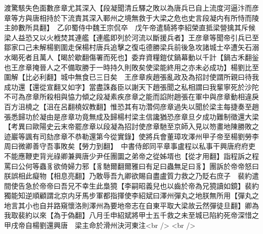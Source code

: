 渡驚駭失色面數彦章尤其深入【段凝聞清丘驛之敗以為唐兵已自上流度河逼汴而彦章等方與唐相持於下流責其深入鄆州之境無救于大梁之危也史言段凝内有所恃而陵主帥數所具翻】　乙卯蜀侍中魏王宗侃卒　戊午帝遣騎將李紹榮直抵梁營擒其斥候梁人益恐又以火栰焚其連艦【連艦即列於河流以斷援兵者】王彦章等聞帝引兵已至鄒家口己未解楊劉圍走保楊村唐兵追擊之復屯德勝梁兵前後急攻諸城士卒遭矢石溺水暍死者且萬人【暍於歇翻傷署而死也】委弃資糧鎧仗鍋幕動以千計【鍋古禾翻釡也王彦章掩晉人之不備取勝于一時持久則敗矣使梁能終用之亦未必成功】楊劉比至圍解【比必利翻】城中無食已三日矣　王彦章疾趙張亂政及為招討使謂所親曰待我成功還【還從宣翻又如字】當盡誅姦臣以謝天下趙張聞之私相謂曰我輩寧死於沙陀不可為彦章所殺相與恊力傾之段凝素疾彦章之能而諂附趙張在軍中與彦章動相違戾百方沮橈之【沮在呂翻橈奴教翻】惟恐其有功濳伺彦章過失以聞於梁主每捷奏至趙張悉歸功於凝由是彦章功竟無成及歸楊村梁主信讒猶恐彦章旦夕成功難制徵還大梁　【考異曰歐陽史云末帝罷彦章以段凝為招討使彦章馳至京師入見以笏畫地陳勝敗之迹巖等諷有司劾彦章不恭勒還第今從實錄】使將兵會董璋攻澤州甲子帝至楊劉勞李周曰微卿善守吾事敗矣【勞力到翻】　中書侍郎同平章事盧程以私事干興唐府府吏不能應鞭吏背光祿卿兼興唐少尹任團圜之弟帝之從姊壻也【從才用翻】詣程訴之程罵曰公何等蟲豸欲倚婦力邪【豸馳爾翻爾雅曰有足曰蟲無足曰豸】團訴於帝帝怒曰朕誤相此癡物【相息亮翻】乃敢辱吾九卿欲賜自盡盧質力救之乃貶右庶子　裴約遣間使告急於帝帝曰吾兄不幸生此梟獍【李嗣昭義兒也以齒於帝為兄獍讀如鏡】裴約獨能知逆順顧謂北京内牙馬步軍都指揮使李紹斌曰澤州彈丸之地朕無所用【彈丸之地言其小也自并路窺懷洛則澤州為要地帝志在自東平取大梁故云然彈徒旦翻】卿為我取裴約以來【為于偽翻】八月壬申紹斌將甲士五千救之未至城已陷約死帝深惜之甲戌帝自楊劉還興唐　梁主命於滑州決河東注<br />
<br />
